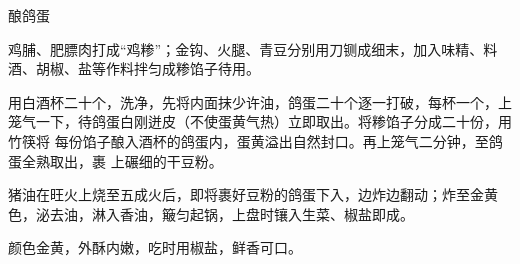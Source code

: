 \begin{recipe}{酿鸽蛋}

\ingredients


\preparation

\step 鸡脯、肥膘肉打成“鸡糁”；金钩、火腿、青豆分别用刀铡成细末，加入味精、料
酒、胡椒、盐等作料拌匀成糁馅子待用。

\step 用白酒杯二十个，洗净，先将内面抹少许油，鸽蛋二十个逐一打破，每杯一个，上
笼气一下，待鸽蛋白刚迸皮（不使蛋黄气热）立即取出。将糁馅子分成二十份，用竹筷将
每份馅子酿入酒杯的鸽蛋内，蛋黄溢出自然封口。再上笼气二分钟，至鸽蛋全熟取出，裹
上碾细的干豆粉。

\step 猪油在旺火上烧至五成火后，即将裹好豆粉的鸽蛋下入，边炸边翻动；炸至金黄
色，泌去油，淋入香油，簸匀起锅，上盘时镶入生菜、椒盐即成。

\features

颜色金黄，外酥内嫩，吃时用椒盐，鲜香可口。

\end{recipe}

